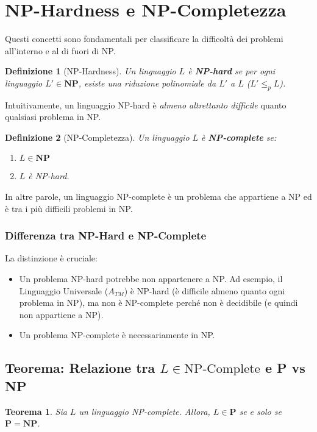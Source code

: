 \documentclass[a4paper]{article}
\newtheorem{theorem}{Teorema}
\newtheorem{definition}{Definizione}
\begin{document}
\section{NP-Hardness e NP-Completezza}

Questi concetti sono fondamentali per classificare la difficoltà dei problemi all'interno e al di fuori di NP.

\begin{definition}[NP-Hardness]
Un linguaggio $L$ è \textbf{NP-hard} se per ogni linguaggio $L' \in \mathbf{NP}$, esiste una riduzione polinomiale da $L'$ a $L$ ($L' \le_p L$).
\end{definition}
Intuitivamente, un linguaggio NP-hard è \emph{almeno altrettanto difficile} quanto qualsiasi problema in NP.

\begin{definition}[NP-Completezza]
Un linguaggio $L$ è \textbf{NP-complete} se:
\begin{enumerate}
    \item $L \in \mathbf{NP}$
    \item $L$ è NP-hard.
\end{enumerate}
\end{definition}
In altre parole, un linguaggio NP-complete è un problema che appartiene a NP ed è tra i più difficili problemi in NP.

\subsubsection{Differenza tra NP-Hard e NP-Complete}
La distinzione è cruciale:
\begin{itemize}
    \item Un problema NP-hard potrebbe non appartenere a NP. Ad esempio, il Linguaggio Universale ($A_{TM}$) è NP-hard (è difficile almeno quanto ogni problema in NP), ma non è NP-complete perché non è decidibile (e quindi non appartiene a NP).
    \item Un problema NP-complete è necessariamente in NP.
\end{itemize}

\subsection{Teorema: Relazione tra $L \in \text{NP-Complete}$ e P vs NP}

\begin{theorem}
Sia $L$ un linguaggio NP-complete. Allora, $L \in \mathbf{P}$ se e solo se $\mathbf{P} = \mathbf{NP}$.
\end{theorem}
\end{document}
